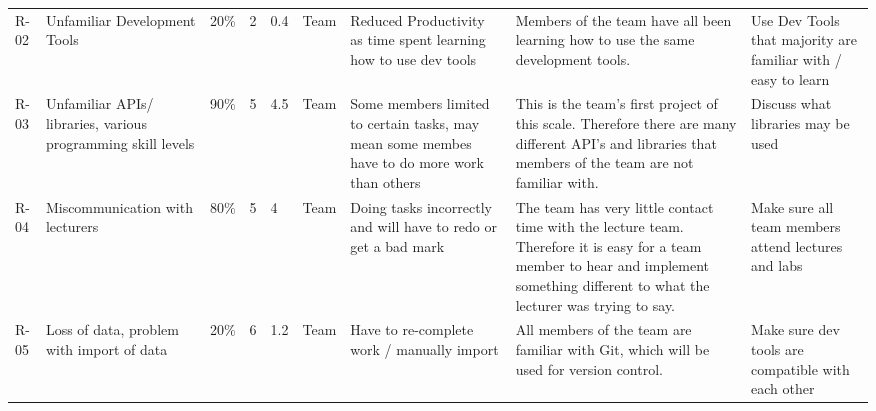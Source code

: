 \begin{table}
\begin{tabular}{lllllllll}
        R-02 & Unfamiliar Development Tools                                               & 20\%          & 2             & 0.4            & Team                & Reduced Productivity as time spent learning how to use dev tools                             & Members of the team have all been learning how to use the same development tools.                                                                                                                                                                                      & Use Dev Tools that majority are familiar with / easy to learn                                     \\
        R-03 & Unfamiliar APIs/ libraries, various programming skill levels               & 90\%          & 5             & 4.5            & Team                & Some members limited to certain tasks, may mean some membes have to do more work than others & This is the team's first project of this scale. Therefore there are many different API’s and libraries that members of the team are not familiar with.                                                                                                                 & Discuss what libraries may be used                                                                \\
        R-04 & Miscommunication with lecturers                                            & 80\%          & 5             & 4              & Team                & Doing tasks incorrectly and will have to redo or get a bad mark                              & The team has very little contact time with the lecture team. Therefore it is easy for a team member to hear and implement something different to what the lecturer was trying to say.                                                                                  & Make sure all team members attend lectures and labs                                               \\
        R-05 & Loss of data, problem with import of data                                  & 20\%          & 6             & 1.2            & Team                & Have to re-complete work / manually import                                                   & All members of the team are familiar with Git, which will be used for version control.                                                                                                                                                                                 & Make sure dev tools are compatible with each other                                                \\

\end{tabular}
\end{table}
